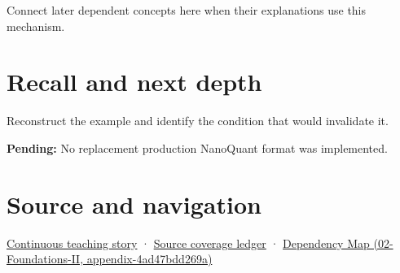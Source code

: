 Connect later dependent concepts here when their explanations use this mechanism.

\section{Recall and next depth}\label{appendix-590bbb2424c1-recall-and-next-depth}

Reconstruct the example and identify the condition that would invalidate it.

\textbf{Pending:} No replacement production NanoQuant format was implemented.

\section{Source and navigation}\label{appendix-590bbb2424c1-source-and-navigation}

\href{Continuous\%20Notes/Computing\%20Foundations\%20-\%20From\%20Bits\%20to\%20C++\%20and\%20Systems\%20APIs\#Bytes\%20become\%20a\%20durable\%20agreement}{Continuous teaching story} · \hyperref[appendix-fd090d982a15]{Source coverage ledger} · \href{../02-Foundations-II/main.pdf\#nameddest=appendix-4ad47bdd269a}{Dependency Map (02-Foundations-II, appendix-4ad47bdd269a)}
